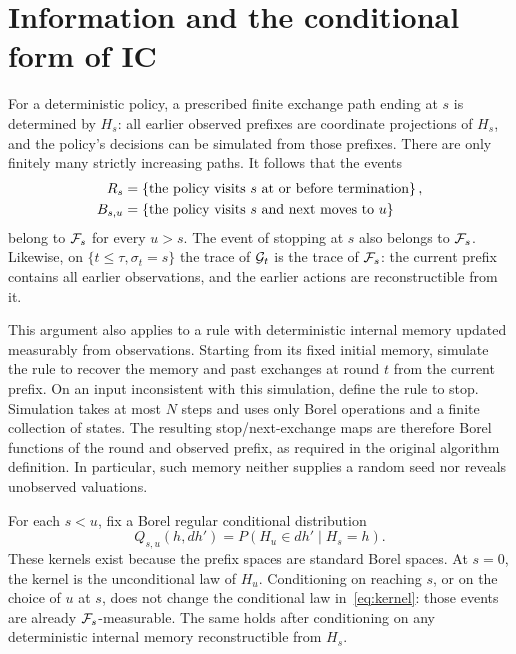 \documentclass[11pt]{extarticle}
\begin{document}
\section{Information and the conditional form of IC}
\label{sec:information}

For a deterministic policy, a prescribed finite exchange path ending at
$s$ is determined by $H_s$: all earlier observed prefixes are coordinate
projections of $H_s$, and the policy's decisions can be simulated from
those prefixes. There are only finitely many strictly increasing paths.
It follows that the events
\begin{align*}
    R_s&=\left\{\text{the policy visits }s\text{ at or before termination}\right\},\\
    B_{s,u}&=\left\{\text{the policy visits }s\text{ and next moves to }u\right\}
\end{align*}
belong to $\mathcal{F}_s$ for every $u>s$. The event of stopping at $s$ also
belongs to $\mathcal{F}_s$. Likewise, on $\{t\leq\tau,\sigma_t=s\}$ the trace
of $\mathcal{G}_t$ is the trace of $\mathcal{F}_s$: the current prefix contains all
earlier observations, and the earlier actions are reconstructible from it.

This argument also applies to a rule with deterministic internal memory
updated measurably from observations. Starting from its fixed initial
memory, simulate the rule to recover the memory and past exchanges at
round $t$ from the current prefix. On an input inconsistent with this
simulation, define the rule to stop. Simulation takes at most $N$ steps
and uses only Borel operations and a finite collection of states. The
resulting stop/next-exchange maps are therefore Borel functions of the
round and observed prefix, as required in the original algorithm
definition. In particular, such memory neither supplies a random seed nor
reveals unobserved valuations.

For each $s<u$, fix a Borel regular conditional distribution
\begin{equation}
    Q_{s,u}(h,dh')=P(H_u\in dh'\mid H_s=h).
    \label{eq:kernel}
\end{equation}
These kernels exist because the prefix spaces are standard Borel spaces.
At $s=0$, the kernel is the unconditional law of $H_u$.
Conditioning on reaching $s$, or on the choice of $u$ at $s$, does not
change the conditional law in~\eqref{eq:kernel}: those events are already
$\mathcal{F}_s$-measurable. The same holds after conditioning on any
deterministic internal memory reconstructible from $H_s$.
\end{document}
